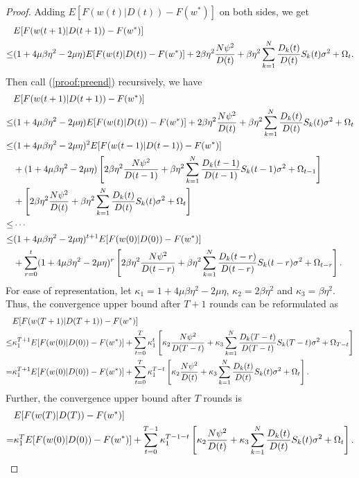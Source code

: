 \documentclass{article}
\theoremstyle{plain}
\theoremstyle{definition}
\theoremstyle{remark}
\begin{document}
\begin{proof}
  Adding $E[F(w(t)|D(t))-F(w^*)]$ on both sides, we get
  \begin{align}
    \label{proof:preend}
         & E[F(w(t+1)|D(t+1)) - F(w^*)] \notag \\
    \leq & (1+4\mu\beta\eta^2-2\mu\eta)E[F(w(t)|D(t))-F(w^*)] + 2\beta\eta^2 \frac{N\psi^2}{D(t)} + \beta\eta^2 \sum_{k=1}^{N} \frac{D_k(t)}{D(t)} S_k(t) \sigma^2 + \Omega_t.
  \end{align}
  Then call (\ref{proof:preend}) recursively, we have
  \begin{align}
         & E[F(w(t+1)|D(t+1)) - F(w^*)] \notag \\
    \leq & (1+4\mu\beta\eta^2-2\mu\eta)E[F(w(t)|D(t))-F(w^*)] + 2\beta\eta^2 \frac{N\psi^2}{D(t)} + \beta\eta^2 \sum_{k=1}^{N} \frac{D_k(t)}{D(t)} S_k(t) \sigma^2 + \Omega_t \notag \\
    \leq & (1+4\mu\beta\eta^2-2\mu\eta)^2E[F(w(t-1)|D(t-1))-F(w^*)] \notag \\
         & + (1+4\mu\beta\eta^2-2\mu\eta)\left[2\beta\eta^2 \frac{N\psi^2}{D(t-1)} + \beta\eta^2 \sum_{k=1}^{N} \frac{D_k(t-1)}{D(t-1)} S_k(t-1) \sigma^2 + \Omega_{t-1}\right] \notag \\
         & + \left[2\beta\eta^2 \frac{N\psi^2}{D(t)} + \beta\eta^2 \sum_{k=1}^{N} \frac{D_k(t)}{D(t)} S_k(t) \sigma^2 + \Omega_t \right] \notag \\
    \leq & \cdots \notag \\
    \leq & (1+4\mu\beta\eta^2-2\mu\eta)^{t+1}E[F(w(0)|D(0))-F(w^*)] \notag \\
         & + \sum_{r=0}^t(1+4\mu\beta\eta^2-2\mu\eta)^r \left[2\beta\eta^2 \frac{N\psi^2}{D(t-r)} + \beta\eta^2 \sum_{k=1}^{N} \frac{D_k(t-r)}{D(t-r)} S_k(t-r) \sigma^2 + \Omega_{t-r} \right].
  \end{align}
  For ease of representation, let $\kappa_1 = 1 + 4\mu\beta\eta^2 - 2\mu\eta$, $\kappa_2 = 2\beta\eta^2$ and $\kappa_3 = \beta\eta^2$.
  Thus, the convergence upper bound after $T+1$ rounds can be reformulated as
  \begin{align}
         & E[F(w(T+1)|D(T+1)) - F(w^*)] \notag \\
    \leq & \kappa_1^{T+1} E[F(w(0)|D(0))-F(w^*)] + \sum_{t=0}^T\kappa_1^t \left[\kappa_2 \frac{N\psi^2}{D(T-t)} + \kappa_3 \sum_{k=1}^{N} \frac{D_k(T-t)}{D(T-t)} S_k(T-t) \sigma^2 + \Omega_{T-t} \right] \notag \\
    =    & \kappa_1^{T+1} E[F(w(0)|D(0))-F(w^*)] + \sum_{t=0}^{T}\kappa_1^{T-t} \left[\kappa_2 \frac{N\psi^2}{D(t)} + \kappa_3 \sum_{k=1}^{N} \frac{D_k(t)}{D(t)} S_k(t) \sigma^2 + \Omega_{t}\right].
  \end{align}
  Further, the convergence upper bound after $T$ rounds is
  \begin{align}
      & E[F(w(T)|D(T)) - F(w^*)] \notag \\ 
    = & \kappa_1^{T} E[F(w(0)|D(0))-F(w^*)] + \sum_{t=0}^{T-1}\kappa_1^{T-1-t} \left[\kappa_2 \frac{N\psi^2}{D(t)} + \kappa_3 \sum_{k=1}^{N} \frac{D_k(t)}{D(t)} S_k(t) \sigma^2 + \Omega_{t}\right].
  \end{align}
\end{proof}
\end{document}
